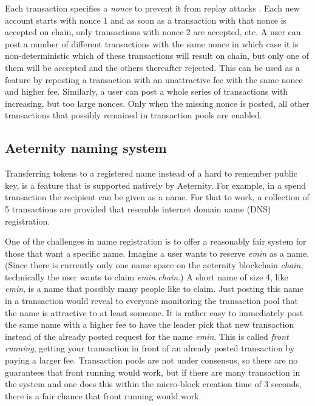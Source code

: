 Each transaction specifies a \textit{nonce}  to prevent it from replay
attacks \cite{Syverson}. Each new account starts with nonce 1 and as
soon as a transaction with that nonce is accepted on chain, only
transactions with nonce 2 are accepted, etc. A user can post a number
of different transactions with the same nonce in which case it is
non-deterministic which of these transactions will result on chain,
but only one of them will be accepted and the others thereafter
rejected. This can be used as a feature by reposting a
transaction with an unattractive fee with the same nonce and higher
fee. Similarly, a user can post a whole series of transactions with
increasing, but too large nonces. Only when the missing nonce is
posted, all other transactions that possibly remained in transaction
pools are enabled.

\subsection{Aeternity naming system}
\label{sect:aens}

Transferring tokens to a registered name instead of a hard to remember
public key, is a feature that is supported natively by Aeternity.
For example, in a spend
transaction the recipient can be given as a name. For that to work, a
collection of 5 transactions are provided that
resemble internet domain name (DNS) registration.

One of the challenges in name registration is to offer a reasonably
fair system for those that want a specific name. Imagine a user wants
to reserve \textit{emin} as a name. (Since there is currently only one
name space on the aeternity blockchain \textit{chain}, technically the
user wants to claim \textit{emin.chain}.)
A short name of size 4, like \textit{emin}, is a name that
possibly many people like to claim. Just posting this name in a
transaction would reveal to everyone monitoring the
transaction pool that the name is attractive to at least someone. It
is rather easy to
immediately post the same name with a higher fee to have the leader
pick that new transaction instead of the already posted request for
the name \textit{emin}. This is called \textit{front running}, getting
your transaction in front of an already posted transaction by paying a
larger fee. Transaction pools are not under consensus, so there are no
guarantees that front running would work, but if there are many
transaction in the system and one does this within the micro-block
creation time of 3 seconds, there is a fair chance that front running
would work.

